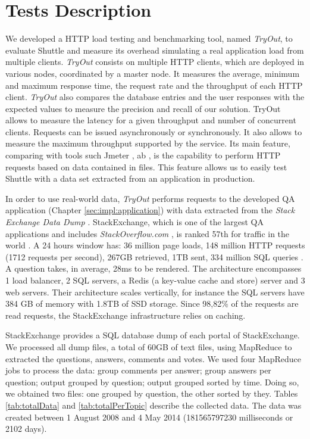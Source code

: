 \section{Tests Description}\label{sec:eval:test_description}

We developed a \ac{HTTP} load testing and benchmarking tool, named \emph{TryOut}, to evaluate Shuttle and measure its overhead simulating a real application load from multiple clients. \emph{TryOut} consists on multiple \ac{HTTP} clients, which are deployed in various nodes, coordinated by a master node. It measures the average, minimum and maximum response time, the request rate and the throughput of each \ac{HTTP} client. \emph{TryOut} also compares the database entries and the user responses with the expected values to measure the precision and recall of our solution. TryOut allows to measure the latency for a given throughput and number of concurrent clients. Requests can be issued asynchronously or synchronously. It also allows to measure the maximum throughput supported by the service. Its main feature, comparing with tools such Jmeter \cite{jmeter}, ab  \cite{weighttp}, is the capability to perform \ac{HTTP} requests based on data contained in files. This feature allows us to easily test Shuttle with a data set extracted from an application in production.

In order to use real-world data, \emph{TryOut} performs requests to the developed \acf{QA} application (Chapter \ref{sec:impl:application}) with data extracted from the \textit{Stack Exchange Data Dump} \cite{stackexchange_data}. StackExchange, which is one of the largest \ac{QA} applications and includes \textit{StackOverflow.com} \cite{stackoverflow}, is ranked 57th for traffic in the world \cite{websiteRanking}. A 24 hours window has: 36 million page loads, 148 million \ac{HTTP} requests (1712 requests per second), 267GB retrieved, 1TB sent, 334 million \ac{SQL} queries \cite{stackStatistics}. A question takes, in average, 28ms to be rendered. The architecture encompasses 1 load balancer, 2 \ac{SQL} servers, a Redis \cite{redis} (a key-value cache and store) server and 3 web servers. Their architecture scales vertically, for instance the \ac{SQL} servers have 384 GB of memory with 1.8TB of SSD storage. Since 98,82\% of the requests are read requests, the StackExchange infrastructure relies on caching.

StackExchange provides a \ac{SQL} database dump of each portal of StackExchange. We processed all dump files, a total of 60GB of text files, using MapReduce \cite{mapreduce} to extracted the questions, answers, comments and votes. We used four MapReduce jobs to process the data: group comments per answer; group answers per question; output grouped by question; output grouped sorted by time. Doing so, we obtained two files: one grouped by question, the other sorted by they. Tables \ref{tab:totalData} and \ref{tab:totalPerTopic} describe the collected data. The data was created between 1 August 2008 and 4 May 2014 (181565797230 milliseconds or 2102 days). 

